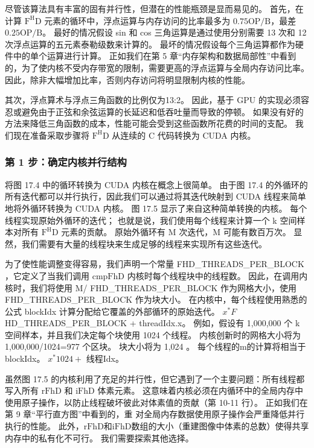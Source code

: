 尽管该算法具有丰富的固有并行性，但潜在的性能瓶颈是显而易见的。 首先，在计算 $\mathrm{F}^{\mathrm{H}} \mathrm{D}$ 元素的循环中，浮点运算与内存访问的比率最多为 $0.75 \mathrm{OP} / \mathrm{B}$，最差 $0.25 \mathrm{OP} / \mathrm{B}$。 最好的情况假设 sin 和 cos 三角运算是通过使用分别需要 13 次和 12 次浮点运算的五元素泰勒级数来计算的。 最坏的情况假设每个三角运算都作为硬件中的单个运算进行计算。 正如我们在第 5 章“内存架构和数据局部性”中看到的，为了使内核不受内存带宽的限制，需要更高的浮点运算与全局内存访问比率。 因此，除非大幅增加比率，否则内存访问将明显限制内核的性能。

其次，浮点算术与浮点三角函数的比例仅为13:2。 因此，基于 GPU 的实现必须容忍或避免由于正弦和余弦运算的长延迟和低吞吐量而导致的停顿。 如果没有好的方法来降低三角函数的成本，性能可能会受到这些函数所花费的时间的支配。 我们现在准备采取步骤将 $\mathrm{F}^{\mathrm{H}} \mathrm{D}$ 从连续的 $\mathrm{C}$ 代码转换为 CUDA 内核。

\subsubsection{第 1 步：确定内核并行结构}
将图 17.4 中的循环转换为 CUDA 内核在概念上很简单。 由于图 17.4 的外循环的所有迭代都可以并行执行，因此我们可以通过将其迭代映射到 CUDA 线程来简单地将外循环转换为 CUDA 内核。 图 17.5 显示了来自这种简单转换的内核。 每个线程实现原始外循环的迭代； 也就是说，我们使用每个线程来计算一个 k 空间样本对所有 $\mathrm{F}^{\mathrm{H}} \mathrm{D}$ 元素的贡献。 原始外循环有 $\mathrm{M}$ 次迭代，$\mathrm{M}$ 可能有数百万次。 显然，我们需要有大量的线程块来生成足够的线程来实现所有这些迭代。

为了使性能调整变得容易，我们声明一个常量 FHD\_THREADS\_PER\_BLOCK ，它定义了当我们调用 $\mathrm{cmpFhD}$ 内核时每个线程块中的线程数。 因此，在调用内核时，我们将使用 M/ FHD\_THREADS\_PER\_BLOCK 作为网格大小，使用 FHD\_THREADS\_PER\_BLOCK 作为块大小。 在内核中，每个线程使用熟悉的公式 blockIdx 计算分配给它覆盖的外部循环的原始迭代。 $x^{*} F$ HD\_THREADS\_PER\_BLOCK + threadIdx.x。 例如，假设有 1,000,000 个 k 空间样本，并且我们决定每个块使用 1024 个线程。 内核创新时的网格大小将为 1,000,000/1024=977 个区块。 块大小将为 1,024 。 每个线程的$\mathrm{m}$的计算将相当于blockIdx。 $x^{*} 1024+$ 线程Idx。

虽然图 17.5 的内核利用了充足的并行性，但它遇到了一个主要问题：所有线程都写入所有 $\mathrm{rFhD}$ 和 $\mathrm{iFhD}$ 体素元素。 这意味着内核必须在内循环中的全局内存中使用原子操作，以防止线程破坏彼此对体素值的贡献（第 10-11 行）。 正如我们在第 9 章“平行直方图”中看到的，重
对全局内存数据使用原子操作会严重降低并行执行的性能。 此外，$\mathrm{rFhD}$和$\mathrm{iFhD}$数组的大小（重建图像中体素的总数）使得共享内存中的私有化不可行。 我们需要探索其他选择。

